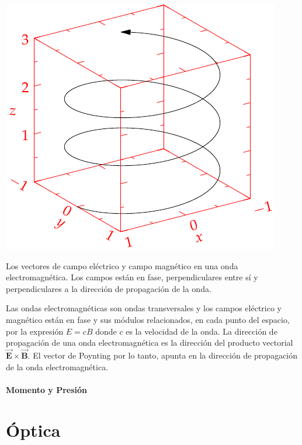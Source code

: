 \documentclass{tufte-handout}
\begin{document}
\begin{marginfigure}%
    \centering
    \includegraphics[width=\linewidth]{helix}
    \caption{Los vectores de campo eléctrico y campo magnético en una onda electromagnética. Los campos están en fase, perpendiculares entre sí y perpendiculares a la dirección de propagación de la onda.}
    \label{fig:ondaelectromagnetica}
\end{marginfigure}

Las ondas electromagnéticas son ondas transversales y los campos eléctrico y magnético están en fase y sus módulos relacionados, en cada punto del espacio, por la expresión $E = cB$  donde $c$ es la velocidad de la onda. La dirección de propagación de una onda electromagnética es la dirección del producto vectorial $\mathbf{\vec{E}}\times\mathbf{\vec{B}}$. El vector de Poynting por lo tanto, apunta en la dirección de propagación de la onda electromagnética.

\paragraph{Momento y Presión}

\clearpage

\section{Óptica}
\end{document}
